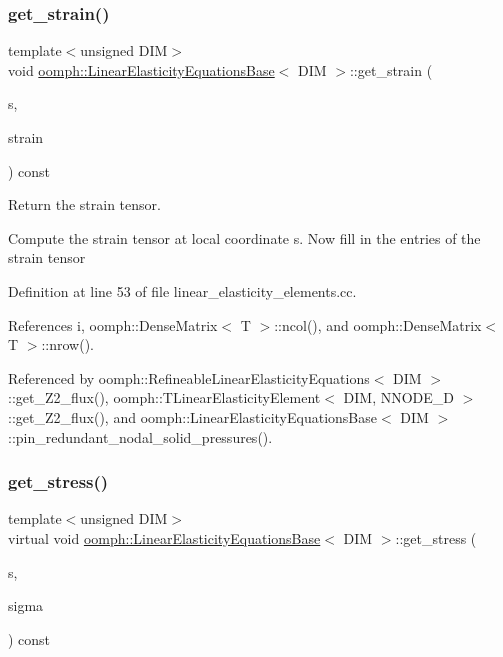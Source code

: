 \subsubsection{\texorpdfstring{get\+\_\+strain()}{get\_strain()}}
{\footnotesize\ttfamily template$<$unsigned D\+IM$>$ \\
void \hyperlink{classoomph_1_1LinearElasticityEquationsBase}{oomph\+::\+Linear\+Elasticity\+Equations\+Base}$<$ D\+IM $>$\+::get\+\_\+strain (\begin{DoxyParamCaption}\item[{const \hyperlink{classoomph_1_1Vector}{Vector}$<$ double $>$ \&}]{s,  }\item[{\hyperlink{classoomph_1_1DenseMatrix}{Dense\+Matrix}$<$ double $>$ \&}]{strain }\end{DoxyParamCaption}) const}



Return the strain tensor. 

Compute the strain tensor at local coordinate s. Now fill in the entries of the strain tensor 

Definition at line 53 of file linear\+\_\+elasticity\+\_\+elements.\+cc.



References i, oomph\+::\+Dense\+Matrix$<$ T $>$\+::ncol(), and oomph\+::\+Dense\+Matrix$<$ T $>$\+::nrow().



Referenced by oomph\+::\+Refineable\+Linear\+Elasticity\+Equations$<$ D\+I\+M $>$\+::get\+\_\+\+Z2\+\_\+flux(), oomph\+::\+T\+Linear\+Elasticity\+Element$<$ D\+I\+M, N\+N\+O\+D\+E\+\_\+D $>$\+::get\+\_\+\+Z2\+\_\+flux(), and oomph\+::\+Linear\+Elasticity\+Equations\+Base$<$ D\+I\+M $>$\+::pin\+\_\+redundant\+\_\+nodal\+\_\+solid\+\_\+pressures().

\mbox{\label{classoomph_1_1LinearElasticityEquationsBase_a2a68942bbdbe42a95e8c221fc5b1a322}} 
\subsubsection{\texorpdfstring{get\+\_\+stress()}{get\_stress()}}
{\footnotesize\ttfamily template$<$unsigned D\+IM$>$ \\
virtual void \hyperlink{classoomph_1_1LinearElasticityEquationsBase}{oomph\+::\+Linear\+Elasticity\+Equations\+Base}$<$ D\+IM $>$\+::get\+\_\+stress (\begin{DoxyParamCaption}\item[{const \hyperlink{classoomph_1_1Vector}{Vector}$<$ double $>$ \&}]{s,  }\item[{\hyperlink{classoomph_1_1DenseMatrix}{Dense\+Matrix}$<$ double $>$ \&}]{sigma }\end{DoxyParamCaption}) const\hspace{0.3cm}{\ttfamily [pure virtual]}}



